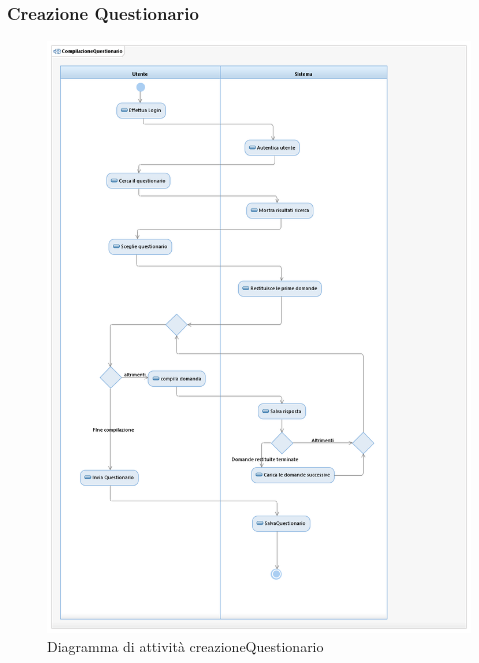 \documentclass[12pt]{article}
\begin{document}
\subsubsection{Creazione Questionario}
\begin{figure}[H]
\centering
\includegraphics[scale=0.47]{UNIMIBModule_CompilazioneQuestionarioActivityDiagram.png}
\caption{Diagramma di attività creazioneQuestionario}
\end{figure}
\end{document}
